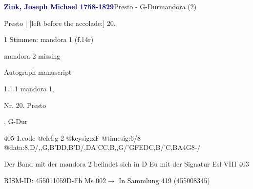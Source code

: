 \documentclass[twocolumn, 12pt]{book}
\begin{document}
\par \vspace{16pt} \textcolor{darkblue}{\textbf{Zink, Joseph Michael  1758-1829}}\hfillplus{\textbf{[405]}}\newline Presto - G-Dur\newline mandora (2)
\par \begin{itshape}[f.14r, at left:] Presto | [left before the accolade:] 20.\end{itshape} 
\par \textcolor{darkblue}{}  1 Stimmen: mandora 1  (f.14r)\newline \begin{small} mandora 2 missing\end{small} \newline Autograph manuscript
\par 1.1.1  mandora 1, \begin{itshape}Nr. 20. Presto\end{itshape}, G-Dur  
\begin{filecontents*}{405-1.code}
@clef:g-2
@keysig:xF
@timesig:6/8
@data:8,D/,,G,B'DD,B'D/,DA'CC,B,,G/{'GFE}{DC,B}/'C,BA4G8-/
\end{filecontents*}
\newline %
\par Der Band mit der mandora 2 befindet sich in D Eu mit der Signatur Esl VIII 403
\par RISM-ID: 455011059\newline D-Fh  Ms 002\newline $\rightarrow$ In Sammlung 419 (455008345)
      
\end{document}

